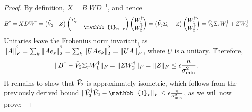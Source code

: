 \begin{proof}
By definition, $X=B^{\dag}WD^{-1}$, and hence
\begin{equation*}
B^{\dag}=XDW^{\dag} = 
\begin{pmatrix}
\Tilde{V}_2 & Z
\end{pmatrix}
\begin{pmatrix}
\Sigma_r &\\
& \mathbb{1}_{n-r}
\end{pmatrix}
\begin{pmatrix}
W_1^{\dag} \\ W_2^{\dag}
\end{pmatrix} = 
\begin{pmatrix}
\Tilde{V}_2 \Sigma_r & Z
\end{pmatrix}
\begin{pmatrix}
W_1^{\dag} \\ W_2^{\dag}
\end{pmatrix} = \Tilde{V}_2\Sigma_r W_1^{\dag} + ZW_2^{\dag}
\end{equation*}
Unitaries leave the Frobenius norm invariant, as $\|A\|_F^{\textstyle ^2}=\sum_k\|Ae_k\|_2^{\textstyle ^2} = \sum_k \|UAe_k\|_2^{\textstyle ^2}=\|UA\|_F^{\textstyle ^2}\thinspace$, where $U$ is a unitary. Therefore,
\begin{equation*}
\|B^{\dag}-\Tilde{V}_2\Sigma_r W_1^{\dag}\|_F=\|ZW_2^{\dag}\|_F=\|Z\|_F\leq\epsilon \frac{n}{\sigma_{\text{min}}^2}.
\end{equation*}
It remains to show that $\Tilde{V}_2$ is approximately isometric, which follows from the previously derived bound $\|\Tilde{V}_2^{\dag}\Tilde{V}_2 -\mathbb{1}_r\|_F\leq\epsilon\frac{n}{\sigma_{\text{min}}^2}$, as we will now prove:


\end{proof}
